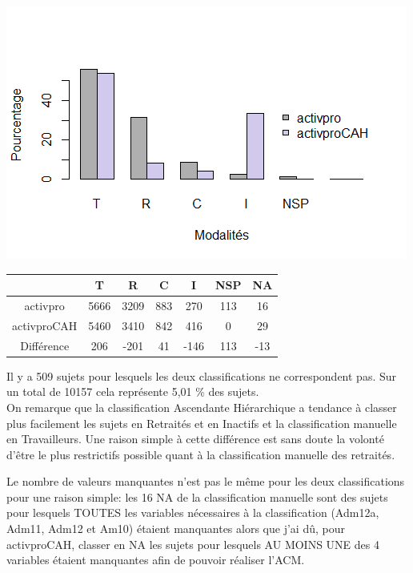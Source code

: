 \documentclass{book}
\begin{document}
\includegraphics[scale=1]{comp_codages_activpro_pourcentage.png}

\begin{center}
\setlength\arrayrulewidth{.5pt}
\begin{tabular}{c|cccccc}

	& T & R & C & I & NSP & NA \\
	\hline
activpro & 5666 & 3209 & 883 & 270 & 113 & 16 \\
activproCAH	 & 5460 & 3410 &  842 & 416 & 0 & 29 \\
\hline
\hline
Différence & 206 & -201 &  41 & -146& 113& -13
\end{tabular}
\end{center}

\noindent
Il y a 509 sujets pour lesquels les deux classifications ne correspondent pas. Sur un total de 10157 cela représente 5,01 \% des sujets.\\
On remarque que la classification Ascendante Hiérarchique a tendance à classer plus facilement les sujets en Retraités et en Inactifs et la classification manuelle en Travailleurs. Une raison simple à cette différence est sans doute la volonté d'être le plus restrictifs possible quant à la classification manuelle des retraités.

\noindent
Le nombre de valeurs manquantes n'est pas le même pour les deux classifications pour une raison simple: les 16 NA de la classification manuelle sont des sujets pour lesquels TOUTES les variables nécessaires à la classification (Adm12a, Adm11, Adm12 et Am10) étaient manquantes alors que j'ai dû, pour activproCAH, classer en NA les sujets pour lesquels AU MOINS UNE des 4 variables étaient manquantes afin de pouvoir réaliser l'ACM.
\end{document}
